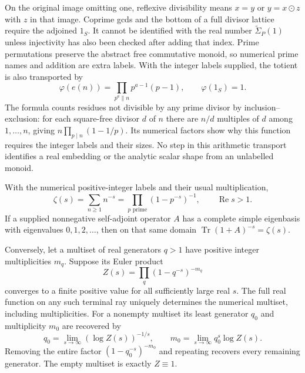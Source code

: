 On the original image omitting one, reflexive divisibility means
$x=y$ or $y=x\odot z$ with $z$ in that image.  Coprime gcds and the
bottom of a full divisor lattice require the adjoined $1_S$.  It
cannot be identified with the real number $\widetilde\Sigma_P(1)$ unless
injectivity has also been checked after adding that index.
Prime permutations preserve the abstract free commutative monoid,
so numerical prime names and addition are extra labels.  With the
integer labels supplied, the totient is also transported by
\[
 \varphi(e(n))=\prod_{p^a\parallel n}p^{a-1}(p-1),
 \qquad\varphi(1_S)=1.
\]
The formula counts residues not divisible by any prime divisor by
inclusion--exclusion: for each square-free divisor $d$ of $n$ there
are $n/d$ multiples of $d$ among $1,\ldots,n$, giving
$n\prod_{p\mid n}(1-1/p)$.  Its numerical factors show why this
function requires the integer labels and their sizes.  No step in
this arithmetic transport identifies a real embedding or the
analytic scalar shape from an unlabelled monoid.

\begin{theorem}
\label{final:B4}
With the numerical positive-integer labels and their usual
multiplication,
\[
 \zeta(s)=\sum_{n\geq1}n^{-s}
          =\prod_{p\text{ prime}}(1-p^{-s})^{-1},
 \qquad\operatorname{Re}s>1.
\]
If a supplied nonnegative self-adjoint operator $A$ has a complete
simple eigenbasis with eigenvalues $0,1,2,\ldots$, then on that same
domain $\operatorname{Tr}(1+A)^{-s}=\zeta(s)$.

Conversely, let a multiset of real generators $q>1$ have positive
integer multiplicities $m_q$.  Suppose its Euler product
\[
 Z(s)=\prod_q(1-q^{-s})^{-m_q}
\]
converges to a finite positive value for all sufficiently large real
$s$.  The full real function on any such terminal ray uniquely
determines the numerical multiset, including multiplicities.
For a nonempty multiset its least generator $q_0$ and multiplicity
$m_0$ are recovered by
\[
 q_0=\lim_{s\to\infty}(\log Z(s))^{-1/s},\qquad
 m_0=\lim_{s\to\infty}q_0^s\log Z(s).
\]
Removing the entire factor $(1-q_0^{-s})^{-m_0}$ and repeating
recovers every remaining generator.  The empty multiset is exactly
$Z\equiv1$.
\end{theorem}

